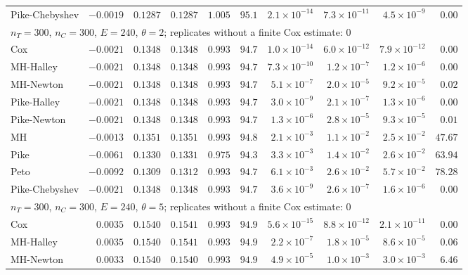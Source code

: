 \begin{landscape}
\begin{longtable}{lrrrrrrrrr}
Pike-Chebyshev & $-0.0019$ & $0.1287$ & $0.1287$ & $1.005$ & $95.1$ & $2.1 \times 10^{-14}$ & $7.3 \times 10^{-11}$ & $4.5 \times 10^{-9}$ & $0.00$ \\
\multicolumn{10}{l}{$n_T = 300$, $n_C = 300$, $E = 240$, $\theta = 2$; replicates without a finite Cox estimate: 0} \\
Cox & $-0.0021$ & $0.1348$ & $0.1348$ & $0.993$ & $94.7$ & $1.0 \times 10^{-14}$ & $6.0 \times 10^{-12}$ & $7.9 \times 10^{-12}$ & $0.00$ \\
MH-Halley & $-0.0021$ & $0.1348$ & $0.1348$ & $0.993$ & $94.7$ & $7.3 \times 10^{-10}$ & $1.2 \times 10^{-7}$ & $1.2 \times 10^{-6}$ & $0.00$ \\
MH-Newton & $-0.0021$ & $0.1348$ & $0.1348$ & $0.993$ & $94.7$ & $5.1 \times 10^{-7}$ & $2.0 \times 10^{-5}$ & $9.2 \times 10^{-5}$ & $0.02$ \\
Pike-Halley & $-0.0021$ & $0.1348$ & $0.1348$ & $0.993$ & $94.7$ & $3.0 \times 10^{-9}$ & $2.1 \times 10^{-7}$ & $1.3 \times 10^{-6}$ & $0.00$ \\
Pike-Newton & $-0.0021$ & $0.1348$ & $0.1348$ & $0.993$ & $94.7$ & $1.3 \times 10^{-6}$ & $2.8 \times 10^{-5}$ & $9.3 \times 10^{-5}$ & $0.01$ \\
MH & $-0.0013$ & $0.1351$ & $0.1351$ & $0.993$ & $94.8$ & $2.1 \times 10^{-3}$ & $1.1 \times 10^{-2}$ & $2.5 \times 10^{-2}$ & $47.67$ \\
Pike & $-0.0061$ & $0.1330$ & $0.1331$ & $0.975$ & $94.3$ & $3.3 \times 10^{-3}$ & $1.4 \times 10^{-2}$ & $2.6 \times 10^{-2}$ & $63.94$ \\
Peto & $-0.0092$ & $0.1309$ & $0.1312$ & $0.993$ & $94.7$ & $6.1 \times 10^{-3}$ & $2.6 \times 10^{-2}$ & $5.7 \times 10^{-2}$ & $78.28$ \\
Pike-Chebyshev & $-0.0021$ & $0.1348$ & $0.1348$ & $0.993$ & $94.7$ & $3.6 \times 10^{-9}$ & $2.6 \times 10^{-7}$ & $1.6 \times 10^{-6}$ & $0.00$ \\
\multicolumn{10}{l}{$n_T = 300$, $n_C = 300$, $E = 240$, $\theta = 5$; replicates without a finite Cox estimate: 0} \\
Cox & $0.0035$ & $0.1540$ & $0.1541$ & $0.993$ & $94.9$ & $5.6 \times 10^{-15}$ & $8.8 \times 10^{-12}$ & $2.1 \times 10^{-11}$ & $0.00$ \\
MH-Halley & $0.0035$ & $0.1540$ & $0.1541$ & $0.993$ & $94.9$ & $2.2 \times 10^{-7}$ & $1.8 \times 10^{-5}$ & $8.6 \times 10^{-5}$ & $0.06$ \\
MH-Newton & $0.0033$ & $0.1540$ & $0.1540$ & $0.993$ & $94.9$ & $4.9 \times 10^{-5}$ & $1.0 \times 10^{-3}$ & $3.0 \times 10^{-3}$ & $6.46$ \\

\end{longtable}
\end{landscape}
